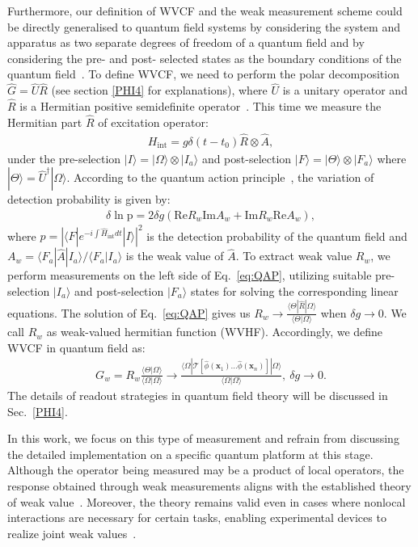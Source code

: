 \documentclass[twocolumn,pra,aps,superscriptaddress]{revtex4-2}
\begin{document}
Furthermore, our definition of WVCF and the weak measurement scheme could be directly generalised to quantum field systems by considering the system and apparatus as two separate degrees of freedom of a quantum field and by considering the pre- and post- selected states as the boundary conditions of the quantum field~\cite{dressel}. To define WVCF, we need to perform the polar decomposition $\hat{G}=\hat{U}\hat{R}$ (see section \ref{PHI4} for explanations), where $\hat{U}$ is a unitary operator and $\hat{R}$ is a Hermitian positive semidefinite operator~\cite{pati}. This time we measure the Hermitian part $\hat{R}$ of excitation operator:
\begin{align}
\label{eq:IntQFT}
H_{\text{int}}=g\delta(t-t_0)\hat{R}\otimes\hat{A},
\end{align}
under the pre-selection $|I\rangle=|\Omega\rangle\otimes|I_a\rangle$ and post-selection $|F\rangle=|\Theta\rangle\otimes| F_a\rangle$ where $|\Theta\rangle=\hat{U}^\dag|\Omega\rangle$.
According to the quantum action principle~\cite{QAP}, the variation of detection probability is given by:
\begin{align}
\label{eq:QAP}
\delta \ln \text{p}=2\delta g\left(\text{Re}R_w\text{Im}A_w+\text{Im}R_w\text{Re}A_w\right),
\end{align}
where $p=\left|\langle F|e^{-i\int \hat{H}_{\text{int}} dt}|I\rangle\right|^2$ is the detection probability of the quantum field and $A_w=\langle F_a|\hat{A}|I_a\rangle/\langle F_a|I_a\rangle$ is the weak value of $\hat{A}$. To extract weak value $R_w$, we perform measurements on the left side of Eq.~\eqref{eq:QAP}, utilizing suitable pre-selection $|I_a\rangle$ and post-selection $|F_a\rangle$ states for solving the corresponding linear equations. The solution of Eq.~\eqref{eq:QAP} gives us $R_w\rightarrow\frac{\langle\Theta|\hat{R}|\Omega\rangle}{\langle\Theta|\Omega\rangle}$ when $\delta g\rightarrow0$.  We call $R_w$ as weak-valued hermitian function (WVHF).  Accordingly, we define WVCF in quantum field as: 
\begin{align}\label{WVCF in QFT}
G_w=R_w\frac{\langle\Theta|\Omega\rangle}{\langle\Omega|\Omega\rangle}
\rightarrow\frac{\langle\Omega| \mathcal{T}[\hat{\phi}(\textbf{x}_1)\ldots\hat{\phi}(\textbf{x}_n)]|\Omega\rangle}{\langle\Omega|\Omega\rangle},~\delta g\rightarrow0.
\end{align}
The details of readout strategies in quantum field theory will be discussed in Sec.~\ref{PHI4}.

In this work, we focus on this type of measurement and refrain from discussing the detailed implementation on a specific quantum platform at this stage. Although the operator being measured may be a product of local operators, the response obtained through weak measurements aligns with the established theory of weak value~\cite{nonlocal}. Moreover, the theory remains valid even in cases where nonlocal interactions are necessary for certain tasks, enabling experimental devices to realize joint weak values~\cite{jwv}.
\end{document}
